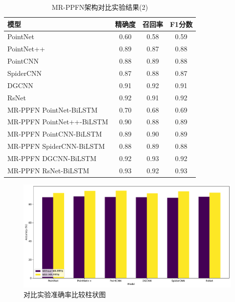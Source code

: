 \begin{table}[htbp]
    \centering
    \caption{MR-PPFN架构对比实验结果(2)}
    \label{tab:MR-PPFN compare res 2}
    \begin{tabular}{lccc}
        \toprule
        \textbf{模型} & \textbf{精确度} & \textbf{召回率} & \textbf{F1分数} \\
        \midrule
        PointNet & 0.60 & 0.58 & 0.59 \\
        PointNet++ & 0.89 & 0.87 & 0.88 \\
        PointCNN & 0.88 & 0.89 & 0.88 \\
        SpiderCNN & 0.87 & 0.88 & 0.87 \\
        DGCNN & 0.91 & 0.92 & 0.91 \\
        RsNet & 0.92 & 0.91 & 0.92 \\
        MR-PPFN PointNet-BiLSTM & 0.70 & 0.68 & 0.69 \\
        MR-PPFN PointNet++-BiLSTM & 0.90 & 0.88 & 0.89 \\
        MR-PPFN PointCNN-BiLSTM & 0.89 & 0.90 & 0.89 \\
        MR-PPFN SpiderCNN-BiLSTM & 0.88 & 0.89 & 0.88 \\
        MR-PPFN DGCNN-BiLSTM & 0.92 & 0.93 & 0.92 \\
        MR-PPFN RsNet-BiLSTM & 0.93 & 0.92 & 0.93 \\
        \bottomrule
    \end{tabular}
\end{table}

\begin{figure}[htbp]
    \centering
    \includegraphics[width=1\linewidth]{imgs/MR-PPFN_accuracy_comparison.pdf}
    \caption{对比实验准确率比较柱状图}
    \label{fig:MR-PPFN_accuracy_comparison}
\end{figure}




